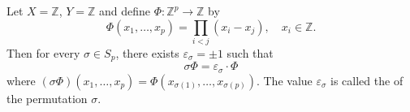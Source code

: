 Let $X = \mathbb{Z}$, $Y = \mathbb{Z}$ and define $\Phi: \mathbb{Z}^p \to \mathbb{Z}$ by
$$\Phi(x_1, \ldots, x_p) = \prod_{i < j} (x_i - x_j), \quad x_i \in \mathbb{Z}.$$
Then for every $\sigma \in S_p$, there exists $\varepsilon_\sigma = \pm 1$ such that
$$\sigma \Phi = \varepsilon_\sigma \cdot \Phi$$
where $(\sigma \Phi)(x_1, \ldots, x_p) = \Phi(x_{\sigma(1)}, \ldots, x_{\sigma(p)})$. The value $\varepsilon_\sigma$ is called the  of the permutation $\sigma$.
